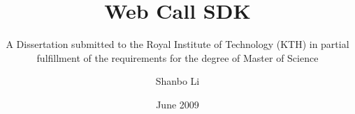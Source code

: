 \title{Web Call SDK}
\subtitle{A Dissertation submitted to
          the Royal Institute of Technology (KTH)
          in partial fulfillment of the requirements for
          the degree of Master of Science}
\author{Shanbo Li}
\date{June 2009}
